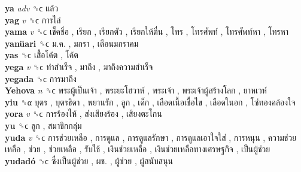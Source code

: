\textbf{ya} \emph{adv}  ␝ϲ   แล้ว   \\
\textbf{yag} \emph{v}  ␝ϲ   การไล่   \\
\textbf{yama} \emph{v}  ␝ϲ   เช็คชื่อ ,  เรียก ,  เรียกตัว ,  เรียกให้ตื่น ,  โทร ,  โทรศัพท์ ,  โทรศัพท์หา ,  โทรหา   \\
\textbf{yanüari} ␝ϲ   ม.ค. ,  มกรา ,  เดือนมกราคม   \\
\textbf{yas} ␝ϲ   เสื้อโค้ต ,  โค้ต   \\
\textbf{yega} \emph{v}  ␝ϲ   ทำสำเร็จ ,  มาถึง ,  มาถึงความสำเร็จ   \\
\textbf{yegada} ␝ϲ   การมาถึง   \\
\textbf{Yehova} \emph{n}  ␝ϲ   พระผู้เป็นเจ้า ,  พระยะโฮวาห์ ,  พระเจ้า ,  พระเจ้าผู้สร้างโลก ,  ยาหเวห์   \\
\textbf{yiu} ␝α   บุตร ,  บุตรธิดา ,  พยานรัก ,  ลูก ,  เด็ก ,  เลือดเนื้อเชื้อไข ,  เลือดในอก ,  โซ่ทองคล้องใจ   \\
\textbf{yora} \emph{v}  ␝ϲ   การร้องไห้ ,  ส่งเสียงร้อง ,  เสียงตะโกน   \\
\textbf{yu} ␝ϲ   ลูก ,  สมาชิกกลุ่ม   \\
\textbf{yuda} \emph{v}  ␝ϲ   การช่วยเหลือ ,  การดูแล ,  การดูแลรักษา ,  การดูแลเอาใจใส่ ,  การหนุน ,  ความช่วยเหลือ ,  ช่วย ,  ช่วยเหลือ ,  รับใช้ ,  เงินช่วยเหลือ ,  เงินช่วยเหลือทางเศรษฐกิจ ,  เป็นผู้ช่วย   \\
\textbf{yudadó} ␝ϲ   ซึ่งเป็นผู้ช่วย ,  ผช. ,  ผู้ช่วย ,  ผู้สนับสนุน   \\
